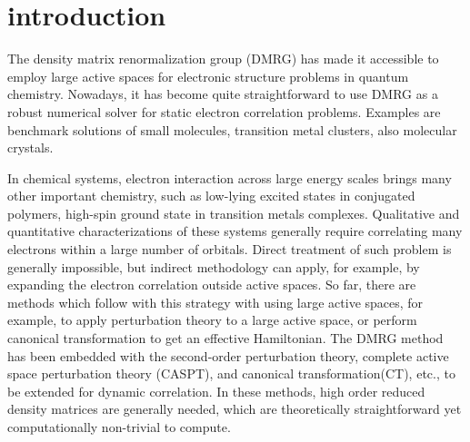 
\section{introduction}

The density matrix renormalization group (DMRG) \cite{white_density_1992,white_density-matrix_1993} has made it accessible to employ large active spaces 
for electronic structure problems in quantum chemistry. Nowadays, it has become quite straightforward to use DMRG as a robust numerical solver for 
static electron correlation problems. Examples are benchmark solutions of small molecules\cite{chan_highly_2002}, transition metal 
clusters\cite{sharma_low-energy_2014, olivares-amaya_ab-initio_2015}, also molecular crystals\cite{yang_ab_2014}. 

In chemical systems, electron interaction across large energy scales brings many other important chemistry, such as low-lying excited states in 
conjugated polymers, high-spin ground state in transition metals complexes. Qualitative and quantitative characterizations of 
these systems generally require correlating many electrons within a large number of orbitals. Direct treatment of such problem is generally 
impossible, but indirect methodology can apply, for example, by expanding the electron correlation outside active spaces. So far, there are 
methods which follow with this strategy with using large active spaces, for example, to apply perturbation theory to a large active space, or 
perform canonical transformation to get an effective Hamiltonian.
The DMRG method has been embedded with the second-order perturbation theory\cite{kurashige_second-order_2011, sharma_communication:_2014}, 
complete active space perturbation theory (CASPT), and canonical transformation(CT)\cite{neuscamman_review_2010}, etc., to be extended for dynamic correlation. In these methods, high order reduced density matrices are generally needed, which are theoretically straightforward yet computationally non-trivial to compute.


